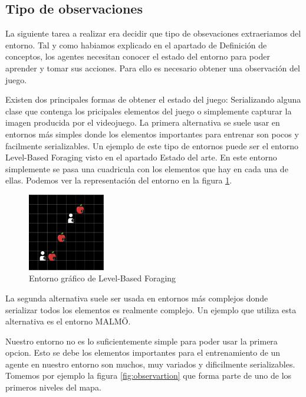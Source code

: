 \subsection{Tipo de observaciones}
La siguiente tarea a realizar era decidir que tipo de obsevaciones extraeriamos del entorno. Tal y como habiamos explicado en el apartado de Definición de conceptos, los agentes necesitan conocer el estado del entorno para poder aprender y tomar sus acciones. Para ello es necesario obtener una observación del juego. 

Existen dos principales formas de obtener el estado del juego: Serializando alguna clase que contenga los pricipales elementos del juego o simplemente capturar la imagen producida por el videojuego. La primera alternativa se suele usar en entornos más simples donde los elementos importantes para entrenar son pocos y facilmente serializables. Un ejemplo de este tipo de entornos puede ser el entorno Level-Based Foraging visto en el apartado Estado del arte. En este entorno simplemente se pasa una cuadricula con los elementos que hay en cada una de ellas. Podemos ver la representación del entorno en la figura \ref {fig:foraging-2}.

\begin{figure}[h]
    \centering
    \includegraphics[width=0.3\textwidth]{img/level-base.png}
    \caption{Entorno gráfico de Level-Based Foraging \cite {env-list}}
    \label{fig:foraging-2}
\end{figure}

La segunda alternativa suele ser usada en entornos más complejos donde serializar todos los elementos es realmente complejo. Un ejemplo que utiliza esta alternativa es el entorno MALMÖ.

Nuestro entorno no es lo suficientemente simple para poder usar la primera opcion. Esto se debe los elementos importantes para el entrenamiento de un agente en nuestro entorno son muchos, muy variados y dificilmente serializables. Tomemos por ejemplo la figura \ref {fig:observartion} que forma parte de uno de los primeros niveles del mapa. 

